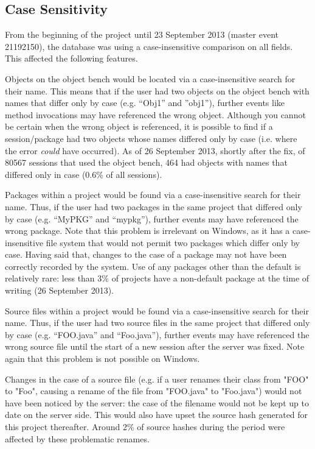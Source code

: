 \documentclass{report}
\begin{document}
\subsection{Case Sensitivity}

From the beginning of the project until 23 September 2013 (master event 21192150), the database was using a case-insensitive comparison on all fields.  This affected the following features.

Objects on the object bench would be located via a case-insensitive search for their name.  This means that if the user had two objects on the object bench with names that differ only by case (e.g. ``Obj1'' and ''obj1''), further events like method invocations may have referenced the wrong object.  Although you cannot be certain when the wrong object is referenced, it is possible to find if a session/package had two objects whose names differed only by case (i.e. where the error \textit{could} have occurred).  As of 26 September 2013, shortly after the fix, of 80567 sessions that used the object bench, 464 had objects with names that differed only in case (0.6\% of all sessions).

Packages within a project would be found via a case-insensitive search for their name.  Thus, if the user had two packages in the same project that differed only by case (e.g. ``MyPKG'' and ``mypkg''), further events may have referenced the wrong package.  Note that this problem is irrelevant on Windows, as it has a case-insensitive file system that would not permit two packages which differ only by case.  Having said that, changes to the case of a package may not have been correctly recorded by the system.  Use of any packages other than the default is relatively rare: less than 3\% of projects have a non-default package at the time of writing (26 September 2013).

Source files within a project would be found via a case-insensitive search for their name.  Thus, if the user had two source files in the same project that differed only by case (e.g. ``FOO.java'' and ``Foo.java''), further events may have referenced the wrong source file until the start of a new session after the server was fixed.  Note again that this problem is not possible on Windows.

Changes in the case of a source file (e.g. if a user renames their class from "FOO" to "Foo", causing a rename of the file from "FOO.java" to "Foo.java") would not have been noticed by the server: the case of the filename would not be kept up to date on the server side.  This would also have upset the source hash generated for this project thereafter.  Around 2\% of source hashes during the period were affected by these problematic renames.
\end{document}
